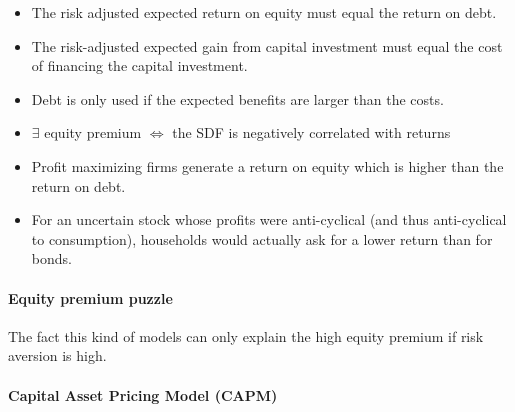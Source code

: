 \documentclass[a4paper,landscape,7pt,fleqn]{scrartcl}
\begin{document}
\begin{multicols*}{3}
\begin{itemize}
\item The risk adjusted expected return on equity must equal the return on debt.
\item The risk-adjusted expected gain from capital investment must equal the cost of financing the capital investment.
\item Debt is only used if the expected benefits are larger than the costs.
\item $\exists$ equity premium $\iff$ the SDF is negatively correlated with returns
\item Profit maximizing firms generate a return on equity which is higher than the return on debt.
\item For an uncertain stock whose profits were anti-cyclical (and thus anti-cyclical to consumption), households would actually ask for a lower return than for bonds.
\end{itemize}

\paragraph{Equity premium puzzle}

The fact this kind of models can only explain the high equity premium if risk aversion is high.

\paragraph{Capital Asset Pricing Model (CAPM)}


\end{multicols*}
\end{document}
